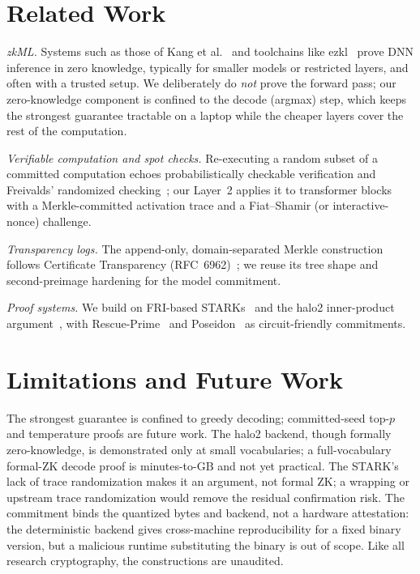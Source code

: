 \documentclass[11pt]{article}
\begin{document}
\section{Related Work}\label{sec:related}

\emph{zkML.} Systems such as those of Kang et al.~\cite{zkml} and toolchains like
ezkl~\cite{ezkl} prove DNN inference in zero knowledge, typically for smaller
models or restricted layers, and often with a trusted setup. We deliberately do
\emph{not} prove the forward pass; our zero-knowledge component is confined to
the decode (argmax) step, which keeps the strongest guarantee tractable on a
laptop while the cheaper layers cover the rest of the computation.

\emph{Verifiable computation and spot checks.} Re-executing a random subset of a
committed computation echoes probabilistically checkable verification and
Freivalds' randomized checking~\cite{freivalds}; our Layer~2 applies it to
transformer blocks with a Merkle-committed activation trace and a Fiat--Shamir
(or interactive-nonce) challenge.

\emph{Transparency logs.} The append-only, domain-separated Merkle construction
follows Certificate Transparency (RFC~6962)~\cite{rfc6962}; we reuse its tree
shape and second-preimage hardening for the model commitment.

\emph{Proof systems.} We build on FRI-based STARKs~\cite{stark} and the halo2
inner-product argument~\cite{bulletproofs,halo}, with Rescue-Prime~\cite{rescue}
and Poseidon~\cite{poseidon} as circuit-friendly commitments.

\section{Limitations and Future Work}\label{sec:limits}

The strongest guarantee is confined to greedy decoding; committed-seed top-$p$
and temperature proofs are future work. The halo2 backend, though formally
zero-knowledge, is demonstrated only at small vocabularies; a full-vocabulary
formal-ZK decode proof is minutes-to-GB and not yet practical. The STARK's lack
of trace randomization makes it an argument, not formal ZK; a wrapping or
upstream trace randomization would remove the residual confirmation risk. The
commitment binds the quantized bytes and backend, not a hardware attestation:
the deterministic backend gives cross-machine reproducibility for a fixed binary
version, but a malicious runtime substituting the binary is out of scope. Like
all research cryptography, the constructions are unaudited.
\end{document}

